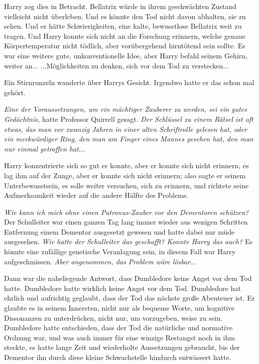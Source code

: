 Harry zog dies in Betracht. Bellatrix würde in ihrem geschwächten Zustand
vielleicht nicht überleben. Und es könnte den Tod nicht davon abhalten, sie zu
sehen. Und er hätte Schwierigkeiten, eine kalte, bewusstlose Bellatrix weit zu
tragen. Und Harry konnte sich nicht an die Forschung erinnern, welche genaue
Körpertemperatur nicht tödlich, aber vorübergehend hirntötend sein sollte. Es
war eine weitere gute, unkonventionelle Idee, aber Harry befahl seinem Gehirn,
weiter an... ...Möglichkeiten zu denken, sich vor dem Tod zu verstecken...

Ein Stirnrunzeln wanderte über Harrys Gesicht. Irgendwo hatte er das schon mal
gehört.

\emph{Eine der Voraussetzungen, um ein mächtiger Zauberer zu werden, sei ein
gutes Gedächtnis, }hatte Professor Quirrell gesagt.\emph{ Der Schlüssel zu einem
Rätsel ist oft etwas, das man vor zwanzig Jahren in einer alten Schriftrolle
gelesen hat, oder ein merkwürdiger Ring, den man am Finger eines Mannes gesehen
hat, den man nur einmal getroffen hat.}..

Harry konzentrierte sich so gut er konnte, aber er konnte sich nicht erinnern,
es lag ihm auf der Zunge, aber er konnte sich nicht erinnern; also sagte er
seinem Unterbewusstsein, es solle weiter versuchen, sich zu erinnern, und
richtete seine Aufmerksamkeit wieder auf die andere Hälfte des Problems.

\emph{Wie kann ich mich ohne einen Patronus-Zauber vor den Dementoren schützen? }
Der Schulleiter war einen ganzen Tag lang immer wieder aus wenigen Schritten
Entfernung einem Dementor ausgesetzt gewesen und hatte dabei nur müde
ausgesehen. \emph{Wie hatte der Schulleiter das geschafft? Konnte Harry das
auch?} Es könnte eine zufällige genetische Veranlagung sein, in diesem Fall war
Harry aufgeschmissen. \emph{Aber angenommen, das Problem wäre lösbar.}..

Dann war die naheliegende Antwort, dass Dumbledore keine Angst vor dem Tod
hatte. Dumbledore hatte wirklich keine Angst vor dem Tod. Dumbledore hat ehrlich
und aufrichtig geglaubt, dass der Tod das nächste große Abenteuer ist. Er
glaubte es in seinem Innersten, nicht nur als bequeme Worte, um kognitive
Dissonanzen zu unterdrücken, nicht nur, um vorzugeben, weise zu sein. Dumbledore
hatte entschieden, dass der Tod die natürliche und normative Ordnung war, und
was auch immer für eine winzige Restangst noch in ihm steckte, es hatte lange
Zeit und wiederholte Aussetzungen gebraucht, bis der Dementor ihn durch diese
kleine Schwachstelle hindurch entwässert hatte.


